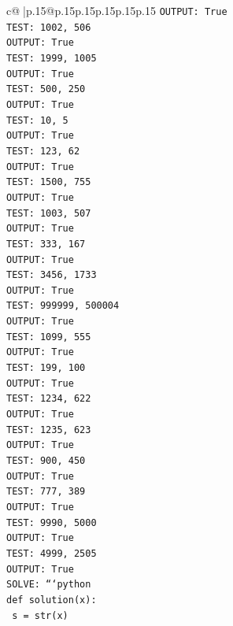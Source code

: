 \documentclass{article}
\begin{document}
{\begin{supertabular}{c@{$\;$}|p{.15\linewidth}@{}p{.15\linewidth}p{.15\linewidth}p{.15\linewidth}p{.15\linewidth}p{.15\linewidth}}
{{{\texttt{OUTPUT: True} \\
\texttt{TEST: 1002, 506} \\
\texttt{OUTPUT: True} \\
\texttt{TEST: 1999, 1005} \\
\texttt{OUTPUT: True} \\
\texttt{TEST: 500, 250} \\
\texttt{OUTPUT: True} \\
\texttt{TEST: 10, 5} \\
\texttt{OUTPUT: True} \\
\texttt{TEST: 123, 62} \\
\texttt{OUTPUT: True} \\
\texttt{TEST: 1500, 755} \\
\texttt{OUTPUT: True} \\
\texttt{TEST: 1003, 507} \\
\texttt{OUTPUT: True} \\
\texttt{TEST: 333, 167} \\
\texttt{OUTPUT: True} \\
\texttt{TEST: 3456, 1733} \\
\texttt{OUTPUT: True} \\
\texttt{TEST: 999999, 500004} \\
\texttt{OUTPUT: True} \\
\texttt{TEST: 1099, 555} \\
\texttt{OUTPUT: True} \\
\texttt{TEST: 199, 100} \\
\texttt{OUTPUT: True} \\
\texttt{TEST: 1234, 622} \\
\texttt{OUTPUT: True} \\
\texttt{TEST: 1235, 623} \\
\texttt{OUTPUT: True} \\
\texttt{TEST: 900, 450} \\
\texttt{OUTPUT: True} \\
\texttt{TEST: 777, 389} \\
\texttt{OUTPUT: True} \\
\texttt{TEST: 9990, 5000} \\
\texttt{OUTPUT: True} \\
\texttt{TEST: 4999, 2505} \\
\texttt{OUTPUT: True} \\
\texttt{SOLVE: ```python} \\
\texttt{def solution(x):} \\
\texttt{    s = str(x)} \\
}}}
\end{supertabular}}
\end{document}
